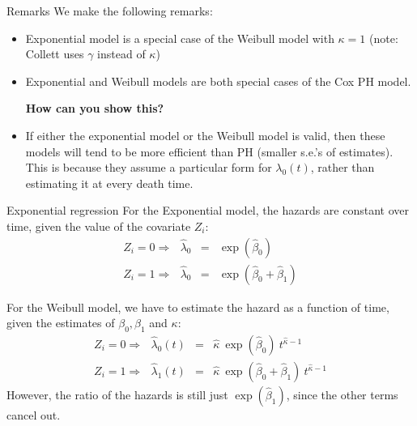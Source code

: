 \documentclass[envcountsect, 10pt, portrait, palatino]{beamer}
\begin{document}
\begin{frame}{Remarks}
We make the following remarks:
\begin{itemize}
\item Exponential model is a special case of the Weibull model
with $\kappa=1$ (note: Collett uses $\gamma$ instead of $\kappa$)

\item Exponential and Weibull models are both special cases of the Cox
PH model.

{\bf How can you show this?}
\item If either the exponential model or the Weibull model is valid,
then these models will tend to be more efficient than PH (smaller
s.e.'s of estimates).  This is because they assume a particular
form for $\lambda_0(t)$, rather than estimating it at every death
time.
\end{itemize}
\end{frame} 
\begin{frame}{Exponential regression}
For the Exponential model, the hazards are constant over time, given
the value of the covariate $Z_i$:
\begin{eqnarray*}
Z_i=0 \Rightarrow~~~
\hat\lambda_0 & = & \exp(\hat\beta_0)\\[1ex]
Z_i=1 \Rightarrow~~~
\hat\lambda_0 & = & \exp(\hat\beta_0+\hat\beta_1)
\end{eqnarray*}

For the Weibull model, we have to estimate the hazard as a
function of time, given the estimates of $\beta_0, \beta_1$ and $\kappa$:
\begin{eqnarray*}
Z_i=0 \Rightarrow~~~
\hat\lambda_0(t) & = & \hat\kappa ~\exp(\hat\beta_0) ~t^{\hat\kappa-1}\\[1ex]
Z_i=1 \Rightarrow~~~
\hat\lambda_1(t) & = & \hat\kappa ~\exp(\hat\beta_0+\hat\beta_1)
~t^{\hat\kappa-1}
\end{eqnarray*}
However, the ratio of the hazards is still just $\exp(\hat\beta_1)$,
since the other terms cancel out.
\end{frame} 
\end{document}
